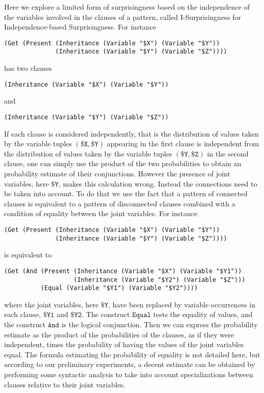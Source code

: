 \documentclass[runningheads]{llncs}
\begin{document}
Here we explore a limited form of surprisingness based on the
independence of the variables involved in the clauses of a pattern,
called I-Surprisingness for Independence-based Surprisingness. For
instance
\begin{verbatim}
(Get (Present (Inheritance (Variable "$X") (Variable "$Y"))
              (Inheritance (Variable "$Y") (Variable "$Z"))))
\end{verbatim}
has two clauses
\begin{verbatim}
(Inheritance (Variable "$X") (Variable "$Y"))
\end{verbatim}
and
\begin{verbatim}
(Inheritance (Variable "$Y") (Variable "$Z"))
\end{verbatim}
If each clause is considered independently, that is the distribution
of values taken by the variable tuples $(\texttt{\$X}, \texttt{\$Y})$
appearing in the first clause is independent from the distribution of
values taken by the variable tuples $(\texttt{\$Y}, \texttt{\$Z})$ in
the second clause, one can simply use the product of the two
probabilities to obtain an probability estimate of their
conjunctions. However the presence of joint variables, here
$\texttt{\$Y}$, makes this calculation wrong. Instead the connections
need to be taken into account. To do that we use the fact that a
pattern of connected clauses is equivalent to a pattern of
disconnected clauses combined with a condition of equality between the
joint variables. For instance
\begin{verbatim}
(Get (Present (Inheritance (Variable "$X") (Variable "$Y"))
              (Inheritance (Variable "$Y") (Variable "$Z"))))
\end{verbatim}
is equivalent to
\begin{verbatim}
(Get (And (Present (Inheritance (Variable "$X") (Variable "$Y1"))
                   (Inheritance (Variable "$Y2") (Variable "$Z")))
          (Equal (Variable "$Y1") (Variable "$Y2"))))
\end{verbatim}
where the joint variables, here $\texttt{\$Y}$, have been replaced by
variable occurrences in each clause, $\texttt{\$Y1}$ and
$\texttt{\$Y2}$. The construct $\texttt{Equal}$ tests the equality of
values, and the construct $\texttt{And}$ is the logical
conjunction.
Then we can express the probability estimate as the product of the
probabilities of the clauses, as if they were independent, times the
probability of having the values of the joint variables equal. The
formula estimating the probability of equality is not detailed here,
but according to our preliminary experiments, a decent estimate can be
obtained by performing some syntactic analysis to take into account
specializations between clauses relative to their joint variables.
\end{document}
